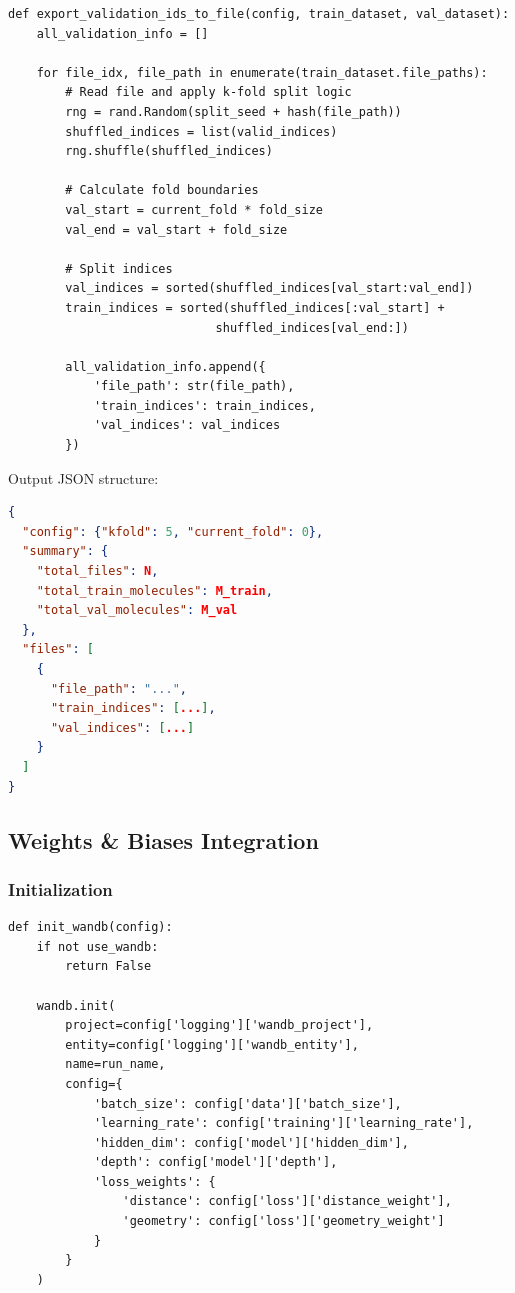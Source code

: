 \documentclass[11pt,a4paper]{article}
\begin{document}
\begin{lstlisting}[caption={Validation IDs Export (lines 258-377)}]
def export_validation_ids_to_file(config, train_dataset, val_dataset):
    all_validation_info = []

    for file_idx, file_path in enumerate(train_dataset.file_paths):
        # Read file and apply k-fold split logic
        rng = rand.Random(split_seed + hash(file_path))
        shuffled_indices = list(valid_indices)
        rng.shuffle(shuffled_indices)

        # Calculate fold boundaries
        val_start = current_fold * fold_size
        val_end = val_start + fold_size

        # Split indices
        val_indices = sorted(shuffled_indices[val_start:val_end])
        train_indices = sorted(shuffled_indices[:val_start] +
                             shuffled_indices[val_end:])

        all_validation_info.append({
            'file_path': str(file_path),
            'train_indices': train_indices,
            'val_indices': val_indices
        })
\end{lstlisting}

Output JSON structure:
\begin{lstlisting}[language=json]
{
  "config": {"kfold": 5, "current_fold": 0},
  "summary": {
    "total_files": N,
    "total_train_molecules": M_train,
    "total_val_molecules": M_val
  },
  "files": [
    {
      "file_path": "...",
      "train_indices": [...],
      "val_indices": [...]
    }
  ]
}
\end{lstlisting}

\subsection{Weights \& Biases Integration}

\subsubsection{Initialization}

\begin{lstlisting}[caption={WandB Setup (lines 442-503)}]
def init_wandb(config):
    if not use_wandb:
        return False

    wandb.init(
        project=config['logging']['wandb_project'],
        entity=config['logging']['wandb_entity'],
        name=run_name,
        config={
            'batch_size': config['data']['batch_size'],
            'learning_rate': config['training']['learning_rate'],
            'hidden_dim': config['model']['hidden_dim'],
            'depth': config['model']['depth'],
            'loss_weights': {
                'distance': config['loss']['distance_weight'],
                'geometry': config['loss']['geometry_weight']
            }
        }
    )
\end{lstlisting}
\end{document}
